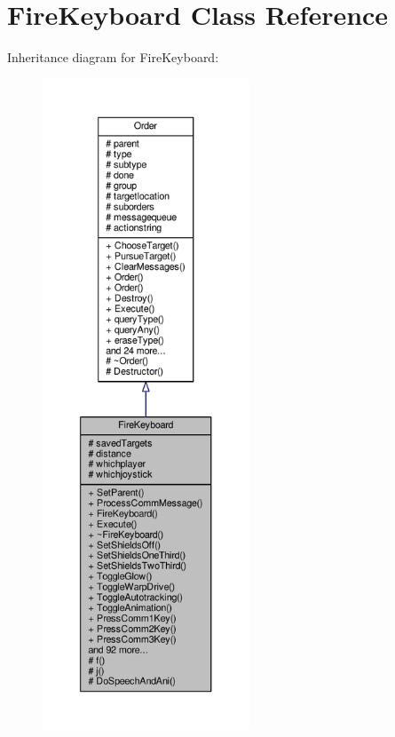 \hypertarget{classFireKeyboard}{}\section{Fire\+Keyboard Class Reference}
\label{classFireKeyboard}


Inheritance diagram for Fire\+Keyboard\+:
\nopagebreak
\begin{figure}[H]
\begin{center}
\leavevmode
\includegraphics[height=550pt]{d0/d8d/classFireKeyboard__inherit__graph}
\end{center}
\end{figure}


